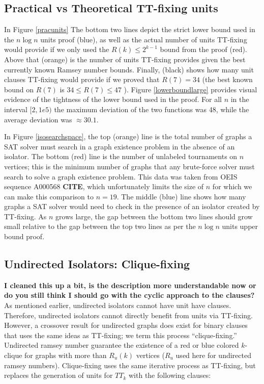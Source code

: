 \documentclass[conference]{IEEEtran}
\begin{document}
\subsection{Practical vs Theoretical TT-fixing units}
In Figure \ref{pracunits} The bottom two lines depict the strict lower bound used in the $n\log n$ units proof (blue), as well as the actual number of units TT-fixing would provide if we only used the $R(k) \leq 2^{k-1}$ bound from the proof (red). Above that (orange) is the number of units TT-fixing provides given the best currently known Ramsey number bounds. Finally, (black) shows how many unit clauses TT-fixing would provide if we proved that $R(7) = 34$ (the best known bound on $R(7)$ is $34 \leq R(7) \leq 47$ \cite{directedramsey}). Figure \ref{lowerboundlarge} provides visual evidence of the tightness of the lower bound used in the proof. For all $n$ in the interval $[2,1e5)$ the maximum deviation of the two functions was 48, while the average deviation was $\approx 30.1$.

In Figure \ref{isosearchspace}, the top (orange) line is the total number of graphs a SAT solver must search in a graph existence problem in the absence of an isolator.  The bottom (red) line is the number of unlabeled tournaments on $n$ vertices; this is the minimum number of graphs that any brute-force solver must search to solve a graph existence problem. This data was taken from OEIS sequence A000568 \textbf{CITE}, which unfortunately limits the size of $n$ for which we can make this comparison to $n=19$. The middle (blue) line shows how many graphs a SAT solver would need to check in the presence of an isolator created by TT-fixing. As $n$ grows large, the gap between the bottom two lines should grow small relative to the gap between the top two lines as per the $n \log n$ units upper bound proof.


\subsection{Undirected Isolators: Clique-fixing}
\textbf{I cleaned this up a bit, is the description more understandable now or do you still think I should go with the cyclic approach to the clauses?}
As mentioned earlier, undirected isolators cannot have unit have clauses. Therefore, undirected isolators cannot directly benefit from units via TT-fixing. However, a crossover result for undirected graphs does exist for binary clauses that uses the same ideas as TT-fixing; we term this process ``clique-fixing.'' Undirected ramsey number guarantee the existence of a red or blue colored $k$-clique for graphs with more than $R_u(k)$ vertices ($R_u$ used here for undirected ramsey numbers). Clique-fixing uses the same iterative process as TT-fixing, but replaces the generation of units for $TT_k$ with the following clauses:
\end{document}
